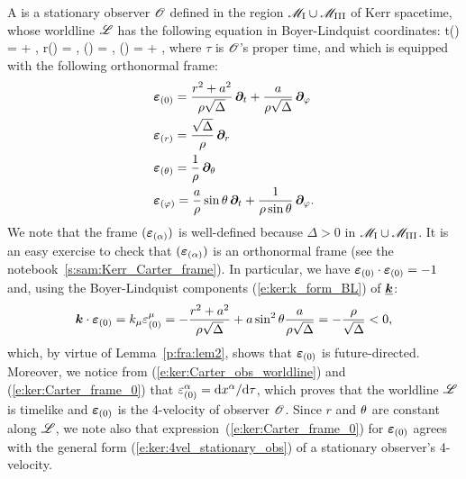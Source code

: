A 
is a stationary observer $\mathscr{O}$ defined in the region $\mathscr{M}_{\rm I}\cup \mathscr{M}_{\rm III}$ of Kerr spacetime, whose
worldline $\mathscr{L}$ has the following equation in Boyer-Lindquist coordinates:
\be \label{e:ker:Carter_obs_worldline}
    t(\tau) = \tau  + , \quad
    r(\tau) = ,\quad
    \th(\tau) = ,\quad
    \ph(\tau) =  \tau + ,
\ee
where $\tau$ is $\mathscr{O}$'s proper time,
and which is equipped with the following orthonormal frame:
\begin{subequations}
\begin{align}
  & \bm{\varepsilon}_{(0)} =
  \frac{r^2 + a^2}{\rho\sqrt{\Delta}} \,
  \bm{\partial}_t + \frac{a}{\rho \sqrt{\Delta}}\, \bm{\partial}_\varphi
    \label{e:ker:Carter_frame_0}\\
  & \bm{\varepsilon}_{(r)} = \frac{\sqrt{\Delta}}{\rho} \, \bm{\partial}_r
    \label{e:ker:Carter_frame_r} \\
  & \bm{\varepsilon}_{(\theta)} = \frac{1}{\rho} \, \bm{\partial}_\theta \\
  & \bm{\varepsilon}_{(\varphi)} =  \frac{a}{\rho}\sin\theta\, \bm{\partial}_t +
     \frac{1}{\rho\sin\theta} \, \bm{\partial}_\varphi .
\end{align}
\end{subequations}
We note that the frame $(\bm{\varepsilon}_{(\alpha)})$ is well-defined because $\Delta > 0$ in $\mathscr{M}_{\rm I}\cup \mathscr{M}_{\rm III}$.
It is an easy exercise to check that $(\bm{\varepsilon}_{(\alpha)})$ is an orthonormal frame
(see the notebook~\ref{s:sam:Kerr_Carter_frame}).
In particular, we have $\bm{\varepsilon}_{(0)} \cdot \bm{\varepsilon}_{(0)}  = -1$ and, using the
Boyer-Lindquist components
(\ref{e:ker:k_form_BL}) of $\underline{\bm{k}}$:
\[
    \bm{k}\cdot\bm{\varepsilon}_{(0)} = k_\mu \varepsilon_{(0)}^\mu = - \frac{r^2 + a^2}{\rho\sqrt{\Delta}}
        + a\sin^2\theta \frac{a}{\rho \sqrt{\Delta}} = - \frac{\rho}{\sqrt{\Delta}} < 0 ,
\]
which, by virtue of Lemma~\ref{p:fra:lem2},
shows that $\bm{\varepsilon}_{(0)}$ is future-directed. Moreover,
we notice from (\ref{e:ker:Carter_obs_worldline}) and (\ref{e:ker:Carter_frame_0})
that $\varepsilon_{(0)}^\alpha = \mathrm{d} x^\alpha / \mathrm{d}\tau$, which proves that the worldline $\mathscr{L}$ is
timelike and $\bm{\varepsilon}_{(0)}$ is the 4-velocity of observer $\mathscr{O}$.
Since $r$ and $\theta$ are constant along $\mathscr{L}$,
we note also that expression~(\ref{e:ker:Carter_frame_0}) for $\bm{\varepsilon}_{(0)}$ agrees with the
general form (\ref{e:ker:4vel_stationary_obs}) of a stationary observer's 4-velocity.

